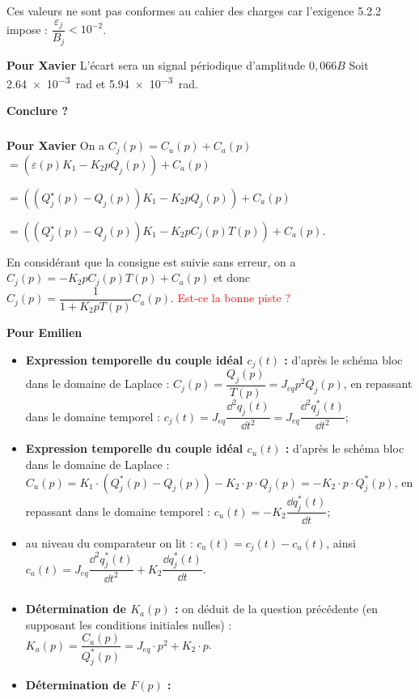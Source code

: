 \documentclass[10pt,fleqn]{article} %
\begin{document}
Ces valeurs ne sont pas conformes au cahier des charges car l'exigence 5.2.2 impose : $\dfrac{\varepsilon_j}{B_j}<10^{-2}$.

\textbf{Pour Xavier}  
 L'écart sera un signal périodique d'amplitude $0,066B$ Soit \SI{2,64e-3}{rad} et \SI{5,94e-3}{rad}.

\textbf{Conclure ?}

\subparagraph{}\textit{}%

\textbf{Pour Xavier}
On a $C_j(p)=C_u(p)+C_a(p)$ 
$=\left(\varepsilon(p)K_1 - K_2 p Q_j(p)\right) + C_a(p) $

$=\left( \left( Q_j^\star (p)-Q_j(p)\right)K_1 - K_2 p Q_j(p)\right) + C_a(p) $

$=\left( \left( Q_j^\star (p)-Q_j(p)\right)K_1 - K_2 p C_j(p) T(p)\right) + C_a(p) $.

En considérant que  la consigne est suivie sans erreur, on a 
$C_j(p)= - K_2 p C_j(p) T(p) + C_a(p) $ et donc $C_j(p)=\dfrac{1}{1+K_2p T(p)}C_a(p)$.
\textcolor{red}{Est-ce la bonne piste ?}

\textbf{Pour Emilien}

\begin{itemize}
\item \textbf{Expression temporelle du couple idéal $c_j(t)$ : }
d'après le schéma bloc dans le domaine de Laplace : $C_j(p)=\dfrac{Q_j(p)}{T(p)}=J_{eq}p^2Q_j(p)$, en repassant dans le domaine temporel : 
$
c_j(t)=J_{eq}\dfrac{\dd ^2q_j(t)}{\dd t^2}=J_{eq}\dfrac{\dd ^2q^*_j(t)}{\dd t^2}
$;
\item \textbf{Expression temporelle du couple idéal $c_u(t)$ : }
d'après le schéma bloc dans le domaine de Laplace : $C_u(p)=K_1\cdot (Q^*_j(p)-Q_j(p))-K_2\cdot p\cdot Q_j(p)=-K_2\cdot p\cdot Q^*_j(p)$, en repassant dans le domaine temporel : 
$
c_u(t)=-K_{2}\dfrac{\dd q^*_j(t)}{\dd t}$;
\item au niveau du comparateur on lit : $c_a(t)=c_j(t)-c_u(t)$, ainsi $c_a(t)=J_{eq}\dfrac{\dd ^2q^*_j(t)}{\dd t^2}+K_{2}\dfrac{\dd q^*_j(t)}{\dd t}$.
\end{itemize}
\subparagraph{}\textit{}%


\begin{itemize}
\item \textbf{Détermination de $K_a(p)$ :} on déduit de la question précédente (en supposant les conditions initiales nulles) : $K_a(p)=\dfrac{C_a(p)}{Q^*_j(p)}=J_{eq}\cdot p^2+K_2\cdot p$.
\item \textbf{Détermination de $F(p)$ :}
\end{itemize}
\end{document}
